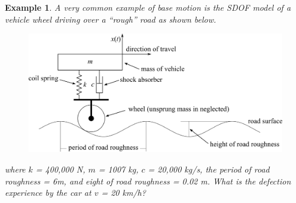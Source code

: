 \documentclass[12pt,letter]{article}
\newtheorem{ex}{Example}
\numberwithin{ex}{section} %
\newenvironment{example}{\begin{mdframed}[middlelinewidth=0.5mm]\begin{ex}\normalfont}{\end{ex}\end{mdframed}}
\numberwithin{re}{section} %
\begin{document}
				\begin{example}
	
					A very common example of base motion is the SDOF model of a vehicle wheel driving over a ``rough'' road as shown below. 
					\begin{figure}[H]
						\centering
						\includegraphics[]{../Figures/vehicle_on_road_example.png}
					\end{figure}				
					where $k$ = 400,000 N, $m$ = 1007 kg, $c$ = 20,000 kg/s, the period of road roughness = 6m, and eight of road roughness = 0.02 m. What is the defection experience by the car at $v$ = 20 km/h?
					

\end{example}
\end{document}
